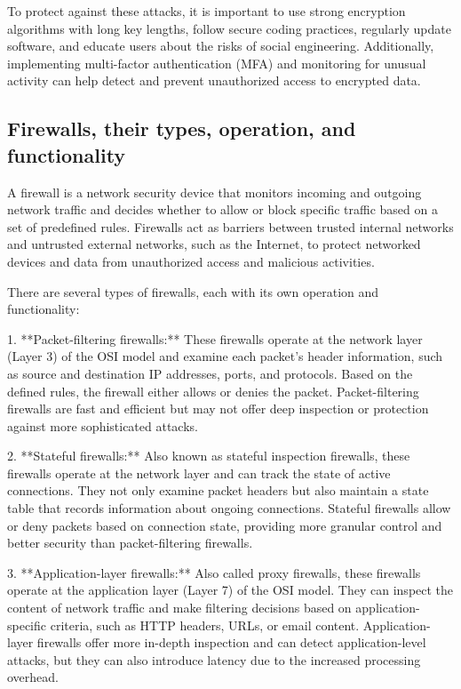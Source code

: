 \documentclass{article}
\begin{document}
To protect against these attacks, it is important to use strong encryption algorithms with long key lengths, follow secure coding practices, regularly update software, and educate users about the risks of social engineering. Additionally, implementing multi-factor authentication (MFA) and monitoring for unusual activity can help detect and prevent unauthorized access to encrypted data.


\subsection{Firewalls, their types, operation, and functionality}

A firewall is a network security device that monitors incoming and outgoing network traffic and decides whether to allow or block specific traffic based on a set of predefined rules. Firewalls act as barriers between trusted internal networks and untrusted external networks, such as the Internet, to protect networked devices and data from unauthorized access and malicious activities.

There are several types of firewalls, each with its own operation and functionality:

1. **Packet-filtering firewalls:** These firewalls operate at the network layer (Layer 3) of the OSI model and examine each packet's header information, such as source and destination IP addresses, ports, and protocols. Based on the defined rules, the firewall either allows or denies the packet. Packet-filtering firewalls are fast and efficient but may not offer deep inspection or protection against more sophisticated attacks.

2. **Stateful firewalls:** Also known as stateful inspection firewalls, these firewalls operate at the network layer and can track the state of active connections. They not only examine packet headers but also maintain a state table that records information about ongoing connections. Stateful firewalls allow or deny packets based on connection state, providing more granular control and better security than packet-filtering firewalls.

3. **Application-layer firewalls:** Also called proxy firewalls, these firewalls operate at the application layer (Layer 7) of the OSI model. They can inspect the content of network traffic and make filtering decisions based on application-specific criteria, such as HTTP headers, URLs, or email content. Application-layer firewalls offer more in-depth inspection and can detect application-level attacks, but they can also introduce latency due to the increased processing overhead.
\end{document}
